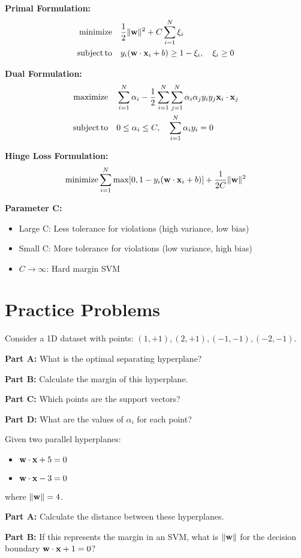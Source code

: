 \documentclass{article}
\newcounter{exercise}
\begin{document}
\textbf{Primal Formulation:}
\begin{align}
\operatorname{minimize} & \quad \frac{1}{2}\|\mathbf{w}\|^2 + C \sum_{i=1}^{N} \xi_i \\
\operatorname{subject\,to} & \quad y_i(\mathbf{w} \cdot \mathbf{x}_i + b) \geq 1 - \xi_i, \quad \xi_i \geq 0
\end{align}

\textbf{Dual Formulation:}
\begin{align}
\operatorname{maximize} & \quad \sum_{i=1}^{N} \alpha_i - \frac{1}{2}\sum_{i=1}^{N}\sum_{j=1}^{N} \alpha_i \alpha_j y_i y_j \mathbf{x}_i \cdot \mathbf{x}_j \\
\operatorname{subject\,to} & \quad 0 \leq \alpha_i \leq C, \quad \sum_{i=1}^{N} \alpha_i y_i = 0
\end{align}

\textbf{Hinge Loss Formulation:}
$$\operatorname{minimize} \sum_{i=1}^{N} \max[0, 1 - y_i(\mathbf{w} \cdot \mathbf{x}_i + b)] + \frac{1}{2C}\|\mathbf{w}\|^2$$

\textbf{Parameter C:}
\begin{itemize}
    \item Large C: Less tolerance for violations (high variance, low bias)
    \item Small C: More tolerance for violations (low variance, high bias)
    \item $C \rightarrow \infty$: Hard margin SVM
\end{itemize}

\section{Practice Problems}

\begin{tcolorbox}[colback=blue!5!white,colframe=blue!75!black,title=Exercise \theexercise: Basic SVM Concepts]
Consider a 1D dataset with points: $(1, +1), (2, +1), (-1, -1), (-2, -1)$.

\textbf{Part A:} What is the optimal separating hyperplane?

\textbf{Part B:} Calculate the margin of this hyperplane.

\textbf{Part C:} Which points are the support vectors?

\textbf{Part D:} What are the values of $\alpha_i$ for each point?
\end{tcolorbox}

\begin{tcolorbox}[colback=blue!5!white,colframe=blue!75!black,title=Exercise \theexercise: Distance Between Hyperplanes]
Given two parallel hyperplanes:
\begin{itemize}
    \item $\mathbf{w} \cdot \mathbf{x} + 5 = 0$
    \item $\mathbf{w} \cdot \mathbf{x} - 3 = 0$
\end{itemize}
where $\|\mathbf{w}\| = 4$.

\textbf{Part A:} Calculate the distance between these hyperplanes.

\textbf{Part B:} If this represents the margin in an SVM, what is $\|\mathbf{w}\|$ for the decision boundary $\mathbf{w} \cdot \mathbf{x} + 1 = 0$?
\end{tcolorbox}
\end{document}
